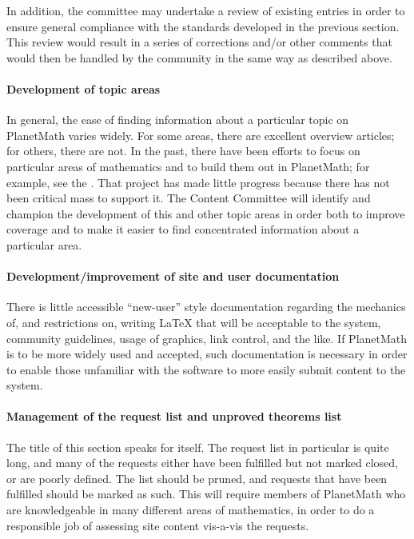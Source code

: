 In addition, the committee may undertake a review of existing entries in order to ensure general compliance with the standards developed in the previous section. This review would result in a series of corrections and/or other comments that would then be handled by the community in the same way as described above.

\paragraph{Development of topic areas}
In general, the ease of finding information about a particular topic on PlanetMath varies widely. For some areas, there are excellent overview articles; for others, there are not. In the past, there have been efforts to focus on particular areas of mathematics and to build them out in PlanetMath; for example, see the \texttt{}. That project has made little progress because there has not been critical mass to support it. The Content Committee will identify and champion the development of this and other topic areas in order both to improve coverage and to make it easier to find concentrated information about a particular area.

\paragraph{Development/improvement of site and user documentation}
There is little accessible ``new-user'' style documentation regarding the mechanics of, and restrictions on, writing LaTeX that will be acceptable to the system, community guidelines, usage of graphics, link control, and the like. If PlanetMath is to be more widely used and accepted, such documentation is necessary in order to enable those unfamiliar with the software to more easily submit content to the system.

\paragraph{Management of the request list and unproved theorems list}
The title of this section speaks for itself. The request list in particular is quite long, and many of the requests either have been fulfilled but not marked closed, or are poorly defined. The list should be pruned, and requests that have been fulfilled should be marked as such. This will require members of PlanetMath who are knowledgeable in many different areas of mathematics, in order to do a responsible job of assessing site content vis-a-vis the requests.
